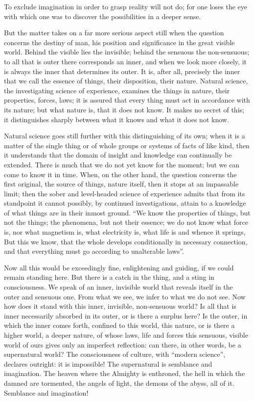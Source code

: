 \documentclass[12pt,a4paper,openany]{book}
\newcommand{\opage}[1]{\marginnote{\footnotesize\textit{[#1]}}}
\begin{document}
To exclude imagination in order to grasp reality will not do; for one loses the eye with which one was to discover
the possibilities in a deeper sense.

But the matter takes on a far more serious aspect still when the question concerns the destiny of man, his position
and significance in the great visible world. Behind the visible lies the invisible; behind the sensuous the
non-sensuous; to all that is outer there corresponds an inner, and when we look more closely, it is always the inner
that determines its outer. It is, after all, precisely the inner that we call the essence of things, their
disposition, their nature. Natural science, the investigating science of experience, examines the things in nature,
their properties, forces, laws; it is assured that every thing must act in accordance with its nature; but what nature
is, that it does not know. It makes no secret of this; it distinguishes sharply between what it knows and what it does
not know.

Natural science goes still further with this distinguishing of its own; when it is a matter of the single thing or of
whole groups or systems of facts of like kind, then it understands that the domain of insight and knowledge can
continually be extended. There is much that we do not yet know for the moment; but we can come to know it in time.
When, on the other hand, the question concerns the first original, the source of things, nature itself, then
\setcounter{footnote}{0}%
\opage{10}it stops at an impassable limit; then the sober and level-headed science of experience admits that from its
standpoint it cannot possibly, by continued investigations, attain to a knowledge of what things are in their inmost
ground. ``We know the properties of things, but not the things; the phenomena, but not their essence; we do not know
what force is, nor what magnetism is, what electricity is, what life is and whence it springs, But this we know, that
the whole develops conditionally in necessary connection, and that everything must go according to unalterable
laws''.

Now all this would be exceedingly fine, enlightening and guiding, if we could remain standing here. But there is a
catch in the thing, and a sting in consciousness. We speak of an inner, invisible world that reveals itself in the
outer and sensuous one. From what we see, we infer to what we do not see. Now how does it stand with this inner,
invisible, non-sensuous world? Is all that is inner necessarily absorbed in its outer, or is there a surplus here? Is
the outer, in which the inner comes forth, confined to this world, this nature, or is there a higher world, a deeper
nature, of whose laws, life and forces this sensuous, visible world of ours gives only an imperfect reflection: can
there, in other words, be a supernatural world? The consciousness of culture, with ``modern science'', declares
outright: it is impossible! The supernatural is semblance and imagination. The heaven where the Almighty is enthroned,
the hell in which the damned are tormented, the angels of light, the demons of the abyss, all of it. Semblance and
imagination!
\end{document}

